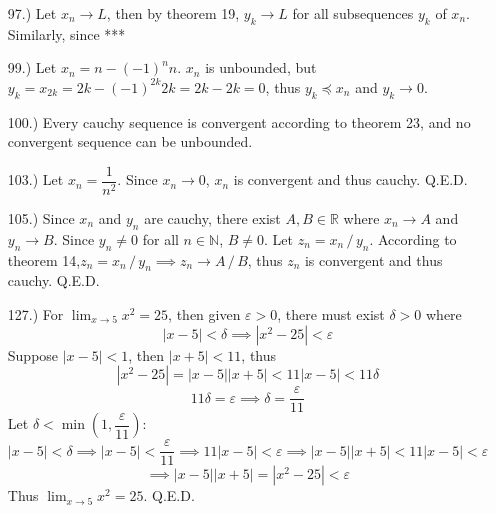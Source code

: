 \documentclass[12pt]{article}
\newcommand{\vertb}[1]{\left\vert#1\right\vert}
\newcommand{\parns}[1]{\left(#1\right)}
\newcommand{\e}{\varepsilon}
\newcommand{\di}{\,/\,}
\newcommand{\lm}[1]{\displaystyle\lim_{#1}}
\begin{document}
\begin{itemize}
    \item [97.)] Let $x_n\to L$, then by theorem 19, $y_k\to L$ for all subsequences $y_k$ of $x_n$. Similarly, since ***

    \item [99.)] Let $x_n=n-(-1)^nn$. $x_n$ is unbounded, but $y_k=x_{2k}=2k-(-1)^{2k}2k=2k-2k=0$, thus $y_k\preceq x_n$ and $y_k\to0$.

    \item [100.)] Every cauchy sequence is convergent according to theorem 23, and no convergent sequence can be unbounded.

    \item [103.)] Let $x_n=\dfrac{1}{n^2}$. Since $x_n\to0$, $x_n$ is convergent and thus cauchy. Q.E.D.

    \item [105.)] Since $x_n$ and $y_n$ are cauchy, there exist $A,B\in\mathbb{R}$ where $x_n\to A$ and $y_n\to B$. Since $y_n\ne0$ for all $n\in\mathbb{N}$, $B\ne0$. Let $z_n=x_n\di y_n$. According to theorem 14,\break $z_n=x_n\di y_n\implies z_n\to A\di B$, thus $z_n$ is convergent and thus cauchy. Q.E.D.














    \item [127.)] For $\lm{x\to5}x^2=25$, then given $\e>0$, there must exist $\delta>0$ where
    \[\vertb{x-5}<\delta\implies\vertb{x^2-25}<\e\]
    Suppose $\vertb{x-5}<1$, then $\vertb{x+5}<11$, thus 
    \[\vertb{x^2-25}=\vertb{x-5}\vertb{x+5}<11\vertb{x-5}<11\delta\]
    \[11\delta=\e\implies\delta=\frac{\e}{11}\]
    Let $\delta<\min\parns{1,\dfrac{\e}{11}}$:
    \[\vertb{x-5}<\delta\implies\vertb{x-5}<\dfrac{\e}{11}\implies11\vertb{x-5}<\e\implies\vertb{x-5}\vertb{x+5}<11\vertb{x-5}<\e\]
    \[\implies\vertb{x-5}\vertb{x+5}=\vertb{x^2-25}<\e\]
    Thus $\lm{x\to5}x^2=25$. Q.E.D.


\end{itemize}
\end{document}
